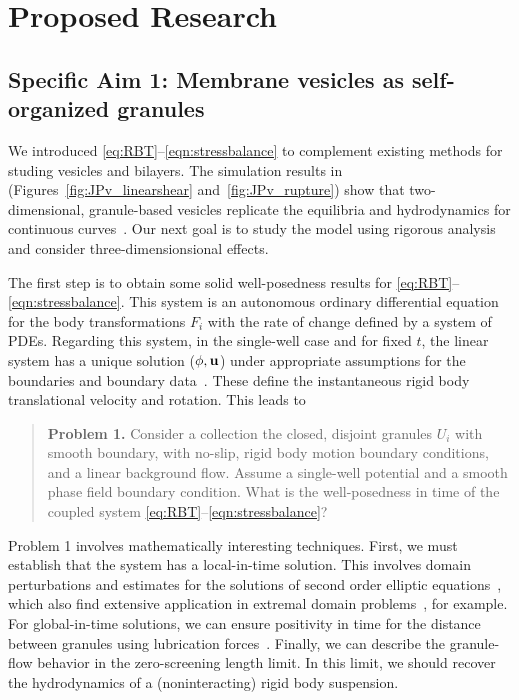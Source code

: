 \section{Proposed Research}
\label{sec:proposed-work}

\subsection{Specific Aim 1: Membrane vesicles as self-organized granules}
\label{sec:specificaim1}
We introduced \eqref{eq:RBT}--\eqref{eqn:stressbalance} to complement
existing methods for studing vesicles and bilayers. The simulation
results in (Figures~\ref{fig:JPv_linearshear} and~\ref{fig:JPv_rupture})
show that two-dimensional, granule-based vesicles replicate the
equilibria and hydrodynamics for continuous curves~\cite{FuQuRyYo22,
Fu2018_SIAM}. Our next goal is to study the model using rigorous
analysis and consider three-dimensionsional effects. 

The first step is to obtain some solid well-posedness results for
\eqref{eq:RBT}--\eqref{eqn:stressbalance}. This system is an autonomous
ordinary differential equation for the body transformations $F_i$ with
the rate of change defined by a system of PDEs. Regarding this system,
in the single-well case and for fixed $t$, the linear system has a
unique solution ($\phi, \mathbf{u}$) under appropriate assumptions for the
boundaries and boundary data~\cite{manasthesis, rac-gre2016, LAX}. These
define the instantaneous rigid body translational velocity and rotation.
This leads to 
\begin{quotation}
  \noindent
  \textbf{Problem 1.} 
  Consider a collection the closed, disjoint granules $U_i$ with smooth
  boundary, with no-slip, rigid body motion boundary conditions, and a
  linear background flow. Assume a single-well potential and a smooth
  phase field boundary condition. What is the well-posedness in time of
  the coupled system \eqref{eq:RBT}--\eqref{eqn:stressbalance}?
\end{quotation}
Problem 1 involves mathematically interesting techniques. First, we
must establish that the system has a local-in-time solution. This
involves domain perturbations and estimates for the solutions of second
order elliptic equations~\cite{Savar2002DomainPA, DANERS20081,
Lamboley2015EstimatesOF}, which also find extensive application in
extremal domain problems~\cite{Schiffer1954VariationOD,
Henrot2006ExtremumPF, bogosel:hal-03607776,Bogosel2022OnTP}, for
example. For global-in-time solutions, we can ensure positivity in time
for the distance between granules using lubrication
forces~\cite{cawthorn_balmforth_2010, leal_2007}. Finally, we can
describe the granule-flow behavior in the zero-screening length limit.
In this limit, we should recover the hydrodynamics of a (noninteracting)
rigid body suspension. 

